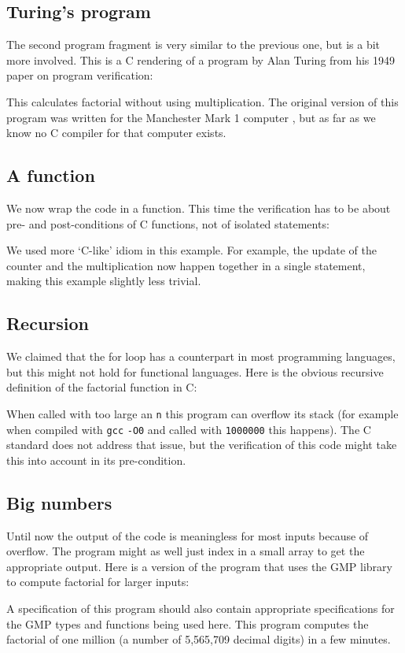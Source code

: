 \documentclass{article}
\begin{document}
\subsection{Turing's program}
The second program fragment is very similar to the previous one, but is a bit more involved.
This is a C rendering of a program by Alan Turing from his 1949 paper \cite{tur:49}
on program verification:

This calculates factorial without using multiplication.
The original version of this program was written for the Manchester Mark 1 computer \cite{wie:16}, but as far as we know no C compiler for that computer exists.

\subsection{A function}
We now wrap the code in a function.
This time the verification has to be about pre- and post-conditions
of C functions, not of isolated statements:

We used more `C-like' idiom in this example.
For example, the update of the counter and the multiplication now
happen together in a single statement, making this example slightly less trivial.

\subsection{Recursion}
We claimed that the for loop has a counterpart in most programming languages,
but this might not hold for functional languages.
Here is the obvious recursive definition of the factorial function in C:

When called with too large an \texttt{n}
this program can overflow its stack
(for example when compiled with \texttt{gcc} \texttt{-O0} and called with
\texttt{1000000} this happens).
The C standard does not address that issue, but the verification of this
code might take this into account in its pre-condition.

\subsection{Big numbers}
Until now the output of the code is meaningless for most inputs because of overflow.
The program might as well just index in a small array to get the appropriate
output.
Here is a version of the program that uses the GMP library \cite{gra:16} to
compute factorial for larger inputs:

A specification of this program should also contain appropriate specifications
for the GMP types and functions being used here.
This program computes the factorial of one million (a number of 5,565,709 decimal digits)
in a few minutes.
\end{document}
